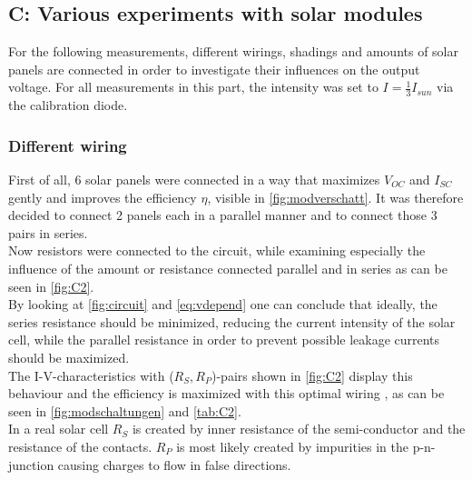 \documentclass[english,  %
parskip=full,  %
headsepline]{scrartcl}
\begin{document}
\subsection{C: Various experiments with solar modules}
For the following measurements, different wirings, shadings and amounts of solar panels are connected in order to investigate their influences on the output voltage. For all measurements in this part, the intensity was set to $I = \frac{1}{3}I_{sun}$ via the calibration diode.
\subsubsection{Different wiring}
First of all, 6 solar panels were connected in a way that maximizes $V_{OC}$ and $I_{SC}$ gently and  improves the efficiency $\eta$, visible in \cref{fig:modverschatt}. It was therefore decided to connect 2 panels each in a parallel manner and to connect those 3 pairs in series.\\
Now resistors were connected to the circuit, while examining especially the influence of the amount or resistance connected parallel and in series as can be seen in \cref{fig:C2}.\\
By looking at \cref{fig:circuit} and \cref{eq:vdepend} one can conclude that ideally, the series resistance should be minimized, reducing the current intensity of the solar cell, while the parallel resistance in order to prevent possible leakage currents should be maximized.\\
The I-V-characteristics with ($R_S, R_P$)-pairs shown in \cref{fig:C2} display this behaviour and the efficiency is maximized with this optimal wiring
, as can be seen in \cref{fig:modschaltungen} and \cref{tab:C2}.\\
In a real solar cell $R_S$ is created by inner resistance of the semi-conductor and the resistance of the contacts. $R_P$ is most likely created by impurities in the p-n-junction causing charges to flow in false directions.
\end{document}
